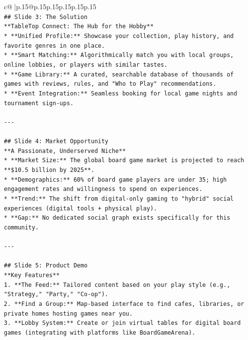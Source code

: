 \documentclass{article}
\begin{document}
{\begin{supertabular}{c@{$\;$}|p{.15\linewidth}@{}p{.15\linewidth}p{.15\linewidth}p{.15\linewidth}p{.15\linewidth}p{.15\linewidth}}
{{{\\ 
\texttt{\#\# Slide 3: The Solution} \\
\texttt{**TableTop Connect: The Hub for the Hobby**} \\
\texttt{*   **Unified Profile:** Showcase your collection, play history, and favorite genres in one place.} \\
\texttt{*   **Smart Matching:** Algorithmically match you with local groups, online lobbies, or players with similar tastes.} \\
\texttt{*   **Game Library:** A curated, searchable database of thousands of games with reviews, rules, and "Who to Play" recommendations.} \\
\texttt{*   **Event Integration:** Seamless booking for local game nights and tournament sign{-}ups.} \\
\\ 
\texttt{{-}{-}{-}} \\
\\ 
\texttt{\#\# Slide 4: Market Opportunity} \\
\texttt{**A Passionate, Underserved Niche**} \\
\texttt{*   **Market Size:** The global board game market is projected to reach **\$10.5 billion by 2025**.} \\
\texttt{*   **Demographics:** 60\% of board game players are under 35; high engagement rates and willingness to spend on experiences.} \\
\texttt{*   **Trend:** The shift from digital{-}only gaming to "hybrid" social experiences (digital tools + physical play).} \\
\texttt{*   **Gap:** No dedicated social graph exists specifically for this community.} \\
\\ 
\texttt{{-}{-}{-}} \\
\\ 
\texttt{\#\# Slide 5: Product Demo} \\
\texttt{**Key Features**} \\
\texttt{1.  **The Feed:** Tailored content based on your play style (e.g., "Strategy," "Party," "Co{-}op").} \\
\texttt{2.  **Find a Group:** Map{-}based interface to find cafes, libraries, or private homes hosting games near you.} \\
\texttt{3.  **Lobby System:** Create or join virtual tables for digital board games (integrating with platforms like BoardGameArena).} \\
}}}
\end{supertabular}}
\end{document}
